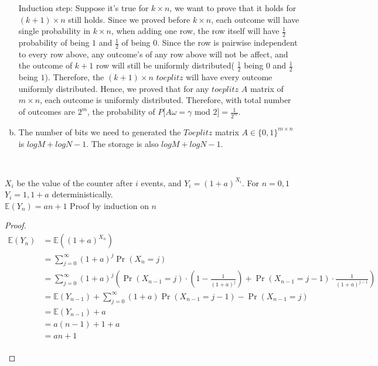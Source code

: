 \documentclass[11pt]{article}%
\begin{document}
\begin{questions}[1]
\begin{enumerate}[(a)]
    \newline
    Induction step: Suppose it's true for $k \times n$, we want to prove that it holds for $(k+1) \times n$ still holds. Since we proved before $k \times n$, each outcome will have single probability in $k \times n$, when adding one row, the row itself will have $\frac{1}{2}$ probability of being $1$ and $\frac{1}{2}$ of being $0$. Since the row is pairwise independent to every row above, any outcome's of any row above will not be affect, and the outcome of $k+1$ row will still be uniformly distributed( $\frac{1}{2}$ being $0$ and $\frac{1}{2}$ being $1$). 
    \newline
    Therefore, the $(k+1) \times n$ $toeplitz$ will have every outcome uniformly distributed. Hence, we proved that for any $toeplitz$ $A$ matrix of $m \times n$, each outcome is uniformly distributed. Therefore, with total number of outcomes are $2^m$, the probability of $P[A\omega = \gamma $ mod $2] = \frac{1}{2^m}$.
    \newline
    \item The number of bits we need to generated the $Toeplitz$ matrix $A \in \{0,1\}^{m \times n}$ is $logM + logN - 1$. The storage is also $logM + logN - 1$.
    \end{enumerate}
    \\
    \newpage
    \item   
    \itemLet $X_i$ be the value of the counter after $i$ events, and $Y_i = (1 + a)^{X_i}$. For $n = 0, 1$ $Y_i = 1, 1 + a$ deterministically. \\
    $\mathbb{E}(Y_n) = an + 1$ Proof by induction on $n$
    \begin{proof}
    \begin{align*}
    \mathbb{E}(Y_n) &= \mathbb{E}((1+a)^{X_n}) \\
    &= \sum_{j = 0}^{\infty}(1+a)^j \Pr(X_n = j) \\
    &= \sum_{j = 0}^{\infty}(1+a)^j (\Pr(X_{n-1} = j) \cdot (1 - \frac{1}{(1+a)^j}) + \Pr(X_{n-1} = j - 1) \cdot \frac{1}{(1+a)^{j-1}}) \\
    &= \mathbb{E}(Y_{n-1}) + \sum_{j = 0}^{\infty}(1+a)\Pr(X_{n-1} = j - 1) - \Pr(X_{n-1} = j) \\
    &= \mathbb{E}(Y_{n-1}) + a \\
    &= a(n-1) + 1 + a \tag{By induction} \\
    &= an + 1
    \end{align*} \\\end{proof}

\end{questions}
\end{document}
